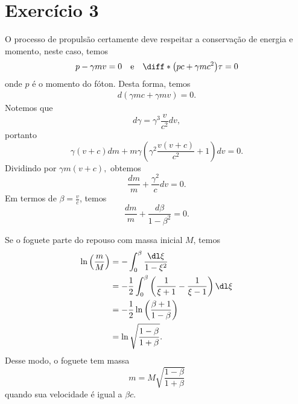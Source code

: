 \section*{Exercício 3}
O processo de propulsão certamente deve respeitar a conservação de energia e momento, neste caso, temos
\begin{equation*}
    p - \gamma m v = 0\quad\text{e}\quad \diff*{\left(pc + \gamma m c^2\right)}{\tau} = 0
\end{equation*}
onde \(p\) é o momento do fóton. Desta forma, temos
\begin{align*}
    d\left(\gamma mc + \gamma m v \right) = 0.
\end{align*}
Notemos que
\begin{equation*}
    d \gamma = \gamma^3 \frac{v}{c^2} dv,
\end{equation*}
portanto
\begin{equation*}
    \gamma (v + c) dm + m \gamma \left(\gamma^2\frac{v(v + c)}{c^2} + 1\right) dv = 0.
\end{equation*}
Dividindo por \(\gamma m (v + c),\) obtemos
\begin{equation*}
    \frac{dm}{m} + \frac{\gamma^2}{c}dv = 0.
\end{equation*}
Em termos de \(\beta = \frac{v}{c}\), temos
\begin{equation*}
    \frac{dm}{m} + \frac{d\beta}{1 - \beta^2} = 0.
\end{equation*}

Se o foguete parte do repouso com massa inicial \(M\), temos
\begin{align*}
    \ln{\left(\frac{m}{M}\right)} &= -\int_0^\beta \frac{\dl\xi}{1 - \xi^2}\\
                                  &= -\frac12 \int_0^\beta \left(\frac1{\xi+1} - \frac1{\xi-1}\right)\dl\xi\\
                                  &= -\frac12\ln{\left(\frac{\beta + 1}{1 - \beta}\right)}\\
                                  &= \ln{\sqrt{\frac{1 - \beta}{1+ \beta}}}.
\end{align*}
Desse modo, o foguete tem massa
\begin{equation*}
    m = M\sqrt{\frac{1 - \beta}{1 + \beta}}
\end{equation*}
quando sua velocidade é igual a \(\beta c\).

